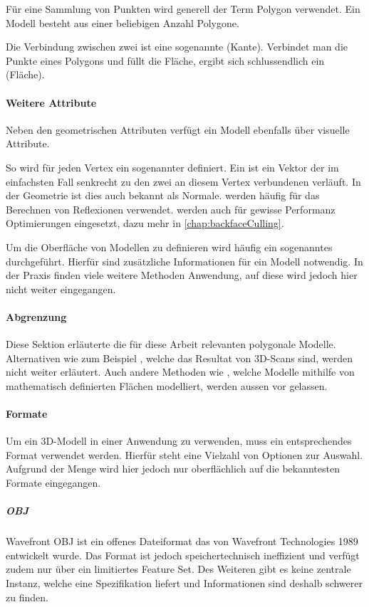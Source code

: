 Für eine Sammlung von Punkten wird generell der Term Polygon verwendet.
Ein Modell besteht aus einer beliebigen Anzahl Polygone.

Die Verbindung zwischen zwei  ist eine sogenannte  (Kante).
Verbindet man die Punkte eines Polygons und füllt die Fläche, ergibt sich schlussendlich ein  (Fläche).

\paragraph{Weitere Attribute}
Neben den geometrischen Attributen verfügt ein Modell ebenfalls über visuelle Attribute.

So wird für jeden Vertex ein sogenannter  definiert. Ein  ist ein Vektor der im einfachsten Fall senkrecht zu den zwei an diesem Vertex verbundenen  verläuft. In der Geometrie ist dies auch bekannt als Normale.  werden häufig für das Berechnen von Reflexionen verwendet.
 werden auch für gewisse Performanz Optimierungen eingesetzt, dazu mehr in \autoref{chap:backfaceCulling}.

Um die Oberfläche von Modellen zu definieren wird häufig ein sogenanntes  durchgeführt. Hierfür sind zusätzliche Informationen für ein Modell notwendig. In der Praxis finden viele weitere Methoden Anwendung, auf diese wird jedoch hier nicht weiter eingegangen.

\paragraph{Abgrenzung}
Diese Sektion erläuterte die für diese Arbeit relevanten polygonale Modelle. Alternativen wie zum Beispiel , welche das Resultat von 3D-Scans sind, werden nicht weiter erläutert. Auch andere Methoden wie , welche Modelle mithilfe von mathematisch definierten Flächen modelliert, werden aussen vor gelassen.

\paragraph{Formate}
Um ein 3D-Modell in einer Anwendung zu verwenden, muss ein entsprechendes Format verwendet werden. Hierfür steht eine Vielzahl von Optionen zur Auswahl. Aufgrund der Menge wird hier jedoch nur oberflächlich auf die bekanntesten Formate eingegangen.

\subparagraph{OBJ}
Wavefront OBJ ist ein offenes Dateiformat das von Wavefront Technologies 1989 entwickelt wurde. Das Format ist jedoch speichertechnisch ineffizient und verfügt zudem nur über ein limitiertes Feature Set. Des Weiteren gibt es keine zentrale Instanz, welche eine Spezifikation liefert und Informationen sind deshalb schwerer zu finden. \cite{objSpec}

